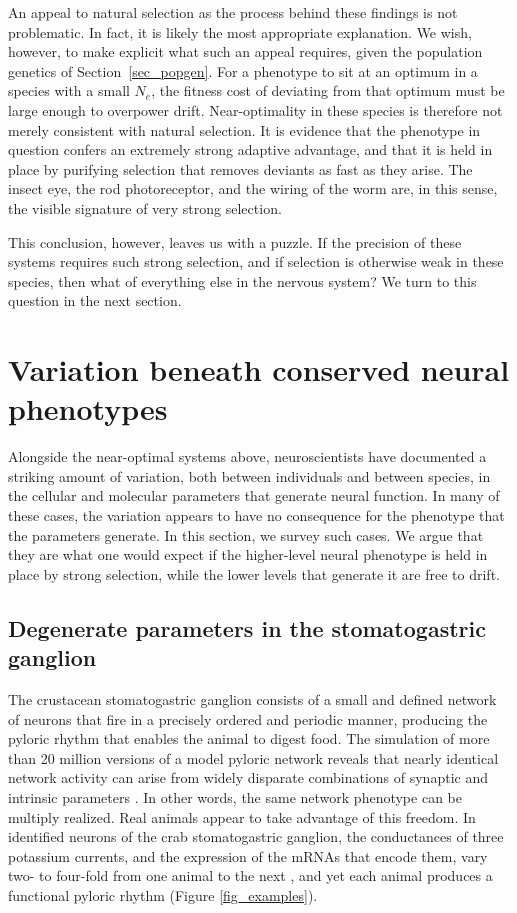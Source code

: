 \documentclass[twocolumn]{article}
\begin{document}
An appeal to natural selection as the process behind these findings is not problematic. In fact, it is likely the most appropriate explanation. We wish, however, to make explicit what such an appeal requires, given the population genetics of Section~\ref{sec_popgen}. For a phenotype to sit at an optimum in a species with a small $N_e$, the fitness cost of deviating from that optimum must be large enough to overpower drift. Near-optimality in these species is therefore not merely consistent with natural selection. It is evidence that the phenotype in question confers an extremely strong adaptive advantage, and that it is held in place by purifying selection that removes deviants as fast as they arise. The insect eye, the rod photoreceptor, and the wiring of the worm are, in this sense, the visible signature of very strong selection.

This conclusion, however, leaves us with a puzzle. If the precision of these systems requires such strong selection, and if selection is otherwise weak in these species, then what of everything else in the nervous system? We turn to this question in the next section.

\section{Variation beneath conserved neural phenotypes} \label{sec_variation}

Alongside the near-optimal systems above, neuroscientists have documented a striking amount of variation, both between individuals and between species, in the cellular and molecular parameters that generate neural function. In many of these cases, the variation appears to have no consequence for the phenotype that the parameters generate. In this section, we survey such cases. We argue that they are what one would expect if the higher-level neural phenotype is held in place by strong selection, while the lower levels that generate it are free to drift.

\subsection{Degenerate parameters in the stomatogastric ganglion}

The crustacean stomatogastric ganglion consists of a small and defined network of neurons that fire in a precisely ordered and periodic manner, producing the pyloric rhythm that enables the animal to digest food. The simulation of more than 20 million versions of a model pyloric network reveals that nearly identical network activity can arise from widely disparate combinations of synaptic and intrinsic parameters \cite{prinz_marder_2004}. In other words, the same network phenotype can be multiply realized. Real animals appear to take advantage of this freedom. In identified neurons of the crab stomatogastric ganglion, the conductances of three potassium currents, and the expression of the mRNAs that encode them, vary two- to four-fold from one animal to the next \cite{Schulz_Goaillard_2006}, and yet each animal produces a functional pyloric rhythm (Figure \ref{fig_examples}).
\end{document}
